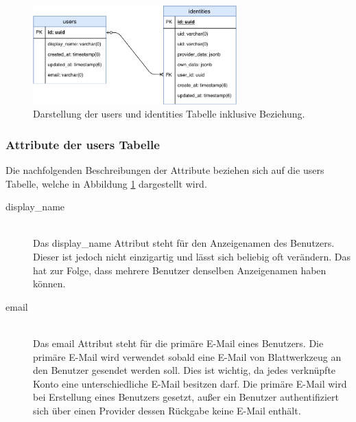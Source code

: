 \begin{figure}[h]
	\centering
	\includegraphics[width=0.7\textwidth]{graphics/users-identities.pdf}
	\caption{Darstellung der users und identities Tabelle inklusive Beziehung.}
	\label{fig:server-users-identities}
\end{figure}

\subsubsection*{Attribute der users Tabelle}
Die nachfolgenden Beschreibungen der Attribute beziehen sich auf die users Tabelle, welche in Abbildung \ref{fig:server-users-identities} dargestellt wird.
\begin{description}
	\item[display\_name]\hfill\\
	Das display\_name Attribut steht für den Anzeigenamen des Benutzers. Dieser ist jedoch nicht einzigartig und lässt sich beliebig oft verändern. Das hat zur Folge, dass mehrere Benutzer denselben Anzeigenamen haben können.
	\item[email]\hfill\\
	Das email Attribut steht für die primäre E-Mail eines Benutzers. Die primäre E-Mail wird verwendet sobald eine E-Mail von Blattwerkzeug an den Benutzer gesendet werden soll. Dies ist wichtig, da jedes verknüpfte Konto eine unterschiedliche E-Mail besitzen darf. Die primäre E-Mail wird bei Erstellung eines Benutzers gesetzt, außer ein Benutzer authentifiziert sich über einen Provider dessen Rückgabe keine E-Mail enthält.
\end{description}

